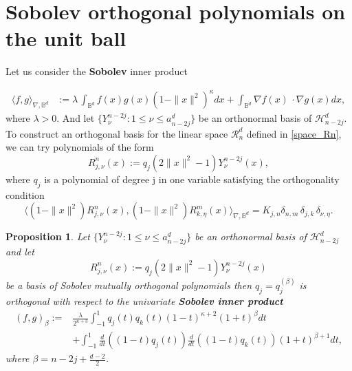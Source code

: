 \documentclass{amsart}
\theoremstyle{plain}%
\newtheorem{prop}[thm]{Proposition}
\theoremstyle{definition}
\theoremstyle{remark}
\begin{document}
 
\section{Sobolev orthogonal polynomials on the unit ball}
\setcounter{equation}{0}

Let us consider the \textbf{Sobolev} inner product 

\begin{align*}
\langle f,g\rangle_{\nabla,\mathbb{B}^d} &:=  \lambda\, \int_{\mathbb{B}^d} f(x) g(x) (1-\|x\|^2)^{\kappa} dx +
    \int_{\mathbb{B}^d} \nabla f(x)\,\cdot \nabla g(x) dx,
\end{align*}
where \(\lambda > 0\). And let $\{Y_\nu^{n-2j}: 1 \le \nu \le a_{n-2j}^d\}$ be an orthonormal basis of $\mathcal{H}_{n-2j}^d$.
To construct an orthogonal basis for the linear space \(\mathcal{R}_n^d\) defined in \eqref{space_Rn}, we can try polynomials of the form 
\[
   R_{j,\nu}^{n}(x) := q_{j}(2 \|x\|^2 -1) Y_\nu^{n-2j}(x),
\]
where \(q_{j}\) is a polynomial of degree j in one variable satisfying the orthogonality condition
\[
\langle (1-\|x\|^2) R_{j,\nu}^{n}(x),(1-\|x\|^2)R_{k,\eta}^{m}(x)\rangle_{\nabla,\mathbb{B}^d} = K_{j,n}  \delta_{n,m}\,\delta_{j,k}\,\delta_{\nu,\eta}.
\]

\begin{prop} \label{prop-3.1}
Let $\{Y_\nu^{n-2j}: 1 \le \nu \le a_{n-2j}^d\}$ be an orthonormal basis of $\mathcal{H}_{n-2j}^d$ and let
\[
R_{j,\nu}^{n}(x) := q_{j}(2 \|x\|^2 -1) Y_\nu^{n-2j}(x)
\]
be a basis of Sobolev mutually orthogonal polynomials then $q_{j} = q_{j}^{(\beta)}$ is orthogonal with respect to the univariate \textbf{Sobolev inner product} 
\begin{align}
    (f,g)_{\beta} := & \frac{\lambda}{2^{\kappa+3}} \int_{-1}^1 q_{j}(t) q_{k}(t) (1-t)^{\kappa + 2} (1+t)^{\beta} dt \nonumber\\
 & +    \int_{-1}^1 \frac{d}{dt}\left((1-t)q_j(t)\right) \frac{d}{dt}\left((1-t)q_k(t)\right) (1+t)^{\beta+1} dt, \label{sob_ip_beta} 
\end{align}
where \(\beta = n -2j + \frac{d-2}{2}\). 
\end{prop}
\end{document}
